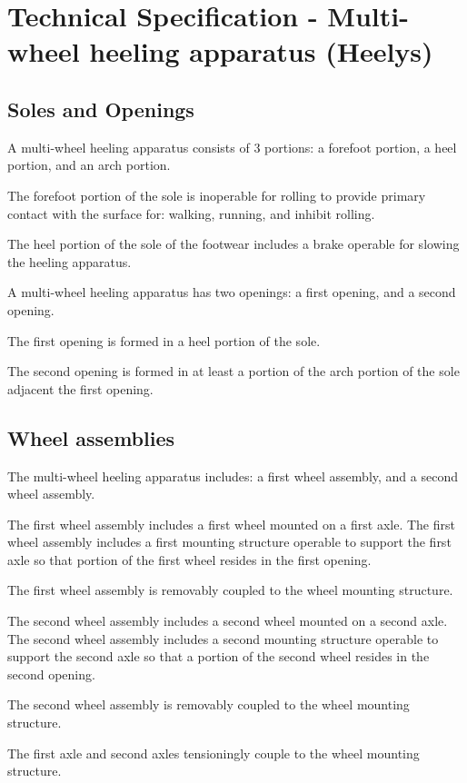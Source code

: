 \documentclass{tech-spec}
\begin{document}
  \chapter{Technical Specification - Multi-wheel heeling apparatus (Heelys)}

  \section*{Soles and Openings}
  \begin{parnumbers}
    A multi-wheel heeling apparatus consists of 3 portions: a forefoot portion, a heel portion, and an arch portion.

    The forefoot portion of the sole is inoperable for rolling to provide primary contact with the surface for: walking, running, and inhibit rolling.

    The heel portion of the sole of the footwear includes a brake operable for slowing the heeling apparatus.

    A multi-wheel heeling apparatus has two openings: a first opening, and a second opening.

    The first opening is formed in a heel portion of the sole.

    The second opening is formed in at least a portion of the arch portion of the sole adjacent the first opening.
  \end{parnumbers}

  \section*{Wheel assemblies}
  \begin{parnumbers}
    The multi-wheel heeling apparatus includes: a first wheel assembly, and a second wheel assembly.

    The first wheel assembly includes a first wheel mounted on a first axle. The first wheel assembly includes a first mounting structure operable to support the first axle so that portion of the first wheel resides in the first opening.

    The first wheel assembly is removably coupled to the wheel mounting structure.

    The second wheel assembly includes a second wheel mounted on a second axle. The second wheel assembly includes a second mounting structure operable to support the second axle so that a portion of the second wheel resides in the second opening.

    The second wheel assembly is removably coupled to the wheel mounting structure.

    The first axle and second axles tensioningly couple to the wheel mounting structure.
  \end{parnumbers}
\end{document}

